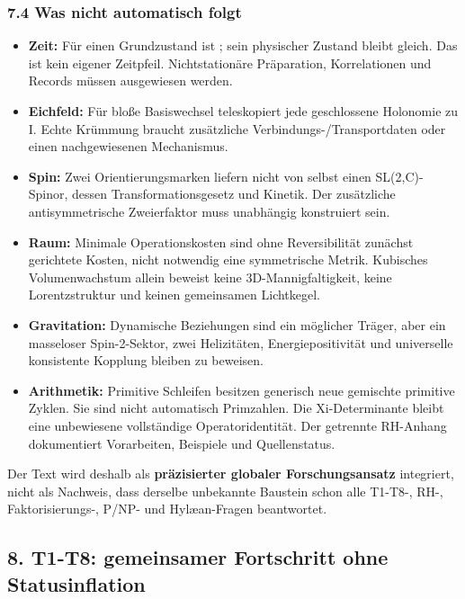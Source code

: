 \subsubsection{7.4 Was nicht automatisch
folgt}\label{was-nicht-automatisch-folgt}

\begin{itemize}
\tightlist
\item
  \textbf{Zeit:} Für einen Grundzustand ist
  ;
  sein physischer Zustand bleibt gleich. Das ist kein eigener Zeitpfeil.
  Nichtstationäre Präparation, Korrelationen und Records müssen
  ausgewiesen werden.
\item
  \textbf{Eichfeld:} Für bloße Basiswechsel 
  teleskopiert jede geschlossene Holonomie zu I. Echte Krümmung braucht
  zusätzliche Verbindungs-/Transportdaten oder einen nachgewiesenen
  Mechanismus.
\item
  \textbf{Spin:} Zwei Orientierungsmarken liefern nicht von selbst einen
  SL(2,C)-Spinor, dessen Transformationsgesetz und Kinetik. Der
  zusätzliche antisymmetrische Zweierfaktor muss unabhängig konstruiert
  sein.
\item
  \textbf{Raum:} Minimale Operationskosten sind ohne Reversibilität
  zunächst gerichtete Kosten, nicht notwendig eine symmetrische Metrik.
  Kubisches Volumenwachstum allein beweist keine 3D-Mannigfaltigkeit,
  keine Lorentzstruktur und keinen gemeinsamen Lichtkegel.
\item
  \textbf{Gravitation:} Dynamische Beziehungen sind ein möglicher
  Träger, aber ein masseloser Spin-2-Sektor, zwei Helizitäten,
  Energiepositivität und universelle konsistente Kopplung bleiben zu
  beweisen.
\item
  \textbf{Arithmetik:} Primitive Schleifen besitzen generisch neue
  gemischte primitive Zyklen. Sie sind nicht automatisch Primzahlen. Die
  Xi-Determinante bleibt eine unbewiesene vollständige
  Operatoridentität. Der getrennte RH-Anhang dokumentiert Vorarbeiten,
  Beispiele und Quellenstatus.
\end{itemize}

Der Text wird deshalb als \textbf{präzisierter globaler
Forschungsansatz} integriert, nicht als Nachweis, dass derselbe
unbekannte Baustein schon alle T1-T8-, RH-, Faktorisierungs-, P/NP- und
Hylæan-Fragen beantwortet.

\subsection{8. T1-T8: gemeinsamer Fortschritt ohne
Statusinflation}\label{t1-t8-gemeinsamer-fortschritt-ohne-statusinflation}

